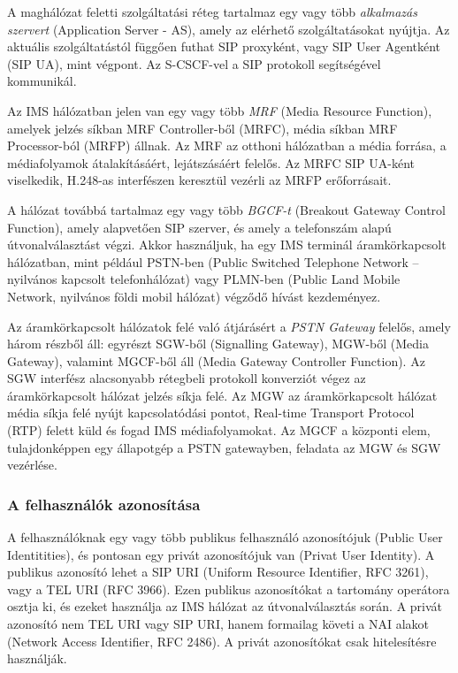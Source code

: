 A maghálózat feletti szolgáltatási réteg tartalmaz egy vagy több \emph{alkalmazás szervert} (Application Server - AS), amely az elérhető szolgáltatásokat nyújtja. Az aktuális szolgáltatástól függően futhat SIP proxyként, vagy SIP User Agentként (SIP UA), mint végpont. Az S-CSCF-vel a SIP protokoll segítségével kommunikál.

Az IMS hálózatban jelen van egy vagy több \emph{MRF} (Media Resource Function), amelyek jelzés síkban MRF Controller-ből (MRFC), média síkban MRF Processor-ból (MRFP) állnak.  Az MRF az otthoni hálózatban a média forrása, a médiafolyamok átalakításáért, lejátszásáért felelős. Az MRFC SIP UA-ként viselkedik, H.248-as interfészen keresztül vezérli az MRFP erőforrásait.

A hálózat továbbá tartalmaz egy vagy több \emph{BGCF-t} (Breakout Gateway Control Function), amely alapvetően SIP szerver, és amely a telefonszám alapú út\-vo\-nal\-vá\-lasz\-tást végzi. Akkor használjuk, ha egy IMS terminál áramkörkapcsolt hálózatban, mint például PSTN-ben (Public Switched Telephone Network – nyilvános kapcsolt telefonhálózat) vagy PLMN-ben (Public Land Mobile Network, nyilvános földi mobil hálózat) végződő hívást kezdeményez.

Az áramkörkapcsolt hálózatok felé való átjárásért a \emph{PSTN Gateway} felelős, a\-mely három részből áll: egyrészt SGW-ből (Signalling Gateway), MGW-ből (Media Gateway), valamint MGCF-ből áll (Media Gateway Controller Function). Az SGW interfész alacsonyabb rétegbeli protokoll konverziót végez az áramkörkapcsolt hálózat jelzés síkja felé. Az MGW az áramkörkapcsolt hálózat média síkja felé nyújt kapcsolatódási pontot, Real-time Transport Protocol (RTP) felett küld és fogad IMS médiafolyamokat. Az MGCF a központi elem, tulajdonképpen egy állapotgép a PSTN gatewayben, feladata az MGW és SGW vezérlése.

\subsubsection{A felhasználók azonosítása}

A felhasználóknak egy vagy több publikus felhasználó azonosítójuk (Public User Identitities), és pontosan egy privát azonosítójuk van (Privat User Identity). A publikus azonosító lehet a SIP URI (Uniform Resource Identifier, RFC 3261), vagy a TEL URI (RFC 3966). Ezen publikus azonosítókat a tartomány operátora osztja ki, és ezeket használja az IMS hálózat az útvonalválasztás során. A privát azonosító nem TEL URI vagy SIP URI, hanem formailag követi a NAI alakot (Network Access Identifier, RFC 2486). A privát azonosítókat csak hitelesítésre használják.

